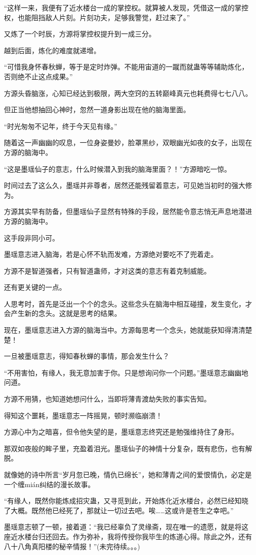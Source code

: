 \begin{this_body}
“这样一来，我便有了近水楼台一成的掌控权。就算被人发现，凭借这一成的掌控权，也能阻挡敌人片刻。片刻功夫，足够我警觉，赶过来了。”

又炼了一个时辰，方源将掌控权提升到一成三分。

越到后面，炼化的难度就递增。

“可惜我身怀春秋蝉，等于是定时炸弹。不能用宙道的一蹴而就蛊等等辅助炼化，否则绝不止这点成果。”

方源头昏脑涨，心知已经达到极限，两大空窍的五转巅峰真元也耗费得七七八八。

但正当他想抽回心神时，忽然一道身影出现在他的脑海里面。

“时光匆匆不记年，终于今天见有缘。”

随着这一声幽幽的叹息，一位身姿曼妙，脸罩黑纱，双眼幽光如夜的女子，出现在方源的脑海中。

“这是墨瑶仙子的意志，什么时候潜入到我的脑海里面？！”方源暗吃一惊。

时间过去了这么久，墨瑶并非尊者，居然还能残留着意志，可见她当初时的强大修为。

方源其实早有防备，但墨瑶仙子显然有特殊的手段，居然能令意志悄无声息地潜进方源的脑海中。

这手段非同小可。

墨瑶意志进入脑海，若是心怀不轨而发难，方源绝对要吃不了兜着走。

方源不是智道强者，只有智道蛊师，才对这类的意志有着克制威能。

还有更关键的一点。

人思考时，首先是泛出一个个的念头。这些念头在脑海中相互碰撞，发生变化，才会产生新的念头。这就是思考的结果。

现在，墨瑶意志进入方源的脑海当中。方源每思考一个念头，她就能获知得清清楚楚！

一旦被墨瑶意志，得知春秋蝉的事情，那会发生什么？

“不用害怕，有缘人，我无意加害于你。只是想询问你一个问题。”墨瑶意志幽幽地问道。

方源不用猜，也知道她想问什么，当即将薄青渡劫失败的事实告知。

得知这个噩耗，墨瑶意志一阵摇晃，顿时濒临崩溃！

方源心中为之暗喜，但令他失望的是，墨瑶意志终究还是勉强维持住了身形。

那双如夜般的眸子里，充盈着泪光。墨瑶仙子的神情十分复杂，既有悲伤，也有解脱。

就像她的诗中所言“岁月忽已晚，情仇已绵长”，她和薄青之间的爱恨情仇，必定是一个缠mián纠结的漫长故事。

“有缘人，既然你能炼成招灾蛊，又寻觅到此，开始炼化近水楼台，必然已经知晓了大概。既然他已经死了，那就让一切过去吧。唉……这或许是苍生之幸吧。”

墨瑶意志顿了一顿，接着道：“我已经辜负了灵缘斋，现在唯一的遗愿，就是将这座近水楼台归还回去。作为弥补，我将传授你我毕生的炼道心得。除此之外，还有八十八角真阳楼的秘辛情报！”(未完待续。。。)

\end{this_body}

